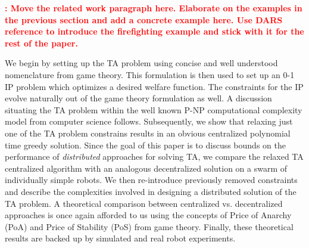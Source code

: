 \documentclass[11pt, onecolumn, compsoc, letterpaper]{article}
\newcounter{comcount}
\newcommand{\mycomment}[1]
{
\refstepcounter{comcount}
\textcolor{red}{\textbf{\emph{\arabic{comcount}}: \small{#1}}}
}
\begin{document}
\mycomment{Move the related work paragraph here. Elaborate on the examples in the previous section and add a concrete example here. Use DARS reference to introduce the firefighting example and stick with it for the rest of the paper.}

We begin by setting up the TA problem using concise and well understood nomenclature from game theory. This formulation is then used to set up an 0-1 IP problem which optimizes a desired welfare function. The constraints for the IP evolve naturally out of the game theory formulation as well. A discussion situating the TA problem within the well known P-NP computational complexity model from computer science follows. Subsequently, we show that relaxing just one of the TA problem constrains results in an obvious centralized polynomial time greedy solution. Since the goal of this paper is to discuss bounds on the performance of \emph{distributed} approaches for solving TA, we compare the relaxed TA centralized algorithm with an analogous decentralized solution on a swarm of individually simple robots. We then re-introduce previously removed constraints and describe the complexities involved in designing a distributed solution of the TA problem. A theoretical comparison between centralized vs. decentralized approaches is once again afforded to us using the concepts of Price of Anarchy (PoA) and Price of Stability (PoS) from game theory. Finally, these theoretical results are backed up by simulated and real robot experiments.


\end{document}
